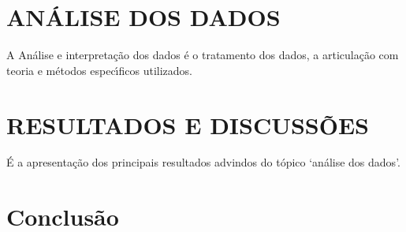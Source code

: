 %

\chapter{ANÁLISE DOS DADOS}

A An\'{a}lise e interpreta\c{c}\~{a}o dos dados \'{e} o tratamento dos dados, a articula\c{c}\~{a}o com teoria e m\'{e}todos espec\'{\i}ficos utilizados.\cite{Cover2006}

\resetlinenumber
\chapter{RESULTADOS E DISCUSS\~{O}ES }

\'{E} a apresenta\c{c}\~{a}o dos principais resultados advindos do t\'{o}pico ‘an\'{a}lise dos dados’.\cite{Feynman1998}


\resetlinenumber
\chapter{Conclus\~{a}o}

\lipsum[31-33]


\nolinenumbers  %


\postextual



%
%


